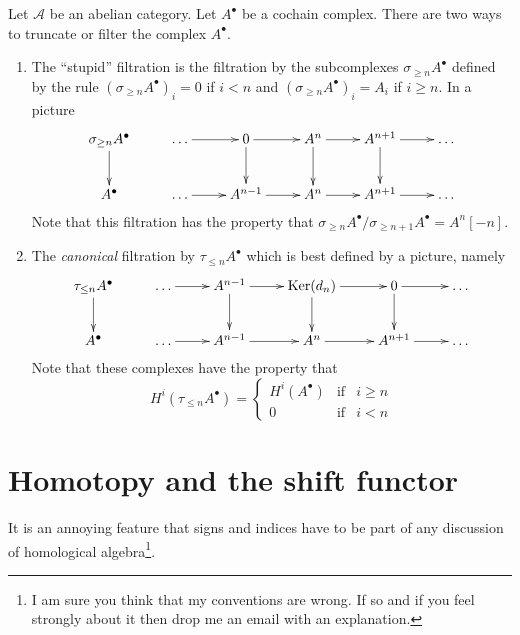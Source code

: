 \medskip\noindent
Let $\mathcal{A}$ be an abelian category.
Let $A^\bullet$ be a cochain complex. There
are two ways to truncate or filter the complex $A^\bullet$.
\begin{enumerate}
\item The ``stupid'' filtration is the filtration by
the subcomplexes $\sigma_{\geq n} A^\bullet$ defined
by the rule $(\sigma_{\geq n} A^\bullet)_i = 0$ if
$i < n$ and $(\sigma_{\geq n} A^\bullet)_i = A_i$ if
$i \geq n$. In a picture
$$
\xymatrix{
\sigma_{\geq n}A^\bullet \ar[d]  &
\ldots \ar[r] &
0 \ar[r] \ar[d] &
A^n \ar[r] \ar[d] &
A^{n + 1} \ar[r] \ar[d] &
\ldots \\
A^\bullet  &
\ldots \ar[r] &
A^{n - 1} \ar[r] &
A^n \ar[r] &
A^{n + 1} \ar[r] &
\ldots
}
$$
Note that this filtration has the property that
$\sigma_{\geq n}A^\bullet / \sigma_{\geq n + 1}A^\bullet
= A^n[-n]$.
\item The {\it canonical} filtration by $\tau_{\leq n}A^\bullet$
which is best defined by a picture, namely
$$
\xymatrix{
\tau_{\leq n}A^\bullet \ar[d]  &
\ldots \ar[r] &
A^{n - 1} \ar[r] \ar[d] &
\text{Ker}(d_n) \ar[r] \ar[d] &
0 \ar[r] \ar[d] &
\ldots \\
A^\bullet  &
\ldots \ar[r] &
A^{n - 1} \ar[r] &
A^n \ar[r] &
A^{n + 1} \ar[r] &
\ldots
}
$$
Note that these complexes have the property that
$$
H^i(\tau_{\leq n}A^\bullet) =
\left\{
\begin{matrix}
H^i(A^\bullet) & \text{if} & i \geq n \\
0 & \text{if} & i < n
\end{matrix}
\right.
$$
\end{enumerate}


















\section{Homotopy and the shift functor}
\label{section-homotopy-shift}

\noindent
It is an annoying feature that signs and indices
have to be part of any discussion of homological
algebra\footnote{I am sure you think that my conventions
are wrong. If so and if you feel strongly about it
then drop me an email with an explanation.}.

